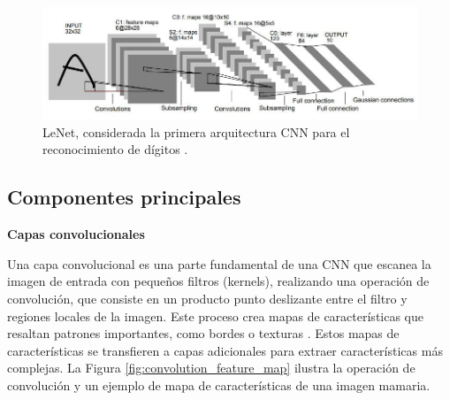 \documentclass[a4paper,10pt]{book}
\begin{document}
\begin{figure}[h!]
    \centering
    \includegraphics[width=0.8\linewidth]{reports//assets/lenet.jpg}
    \caption[LeNet CNN]{LeNet, considerada la primera arquitectura CNN para el reconocimiento de dígitos \cite{lecun_gradient-based_1998}.}
    \label{fig:lenet}
\end{figure}

\subsection{Componentes principales}

\textbf{Capas convolucionales}

Una capa convolucional es una parte fundamental de una CNN que escanea la imagen de entrada con pequeños filtros (kernels), realizando una operación de convolución, que consiste en un producto punto deslizante entre el filtro y regiones locales de la imagen. Este proceso crea mapas de características que resaltan patrones importantes, como bordes o texturas \cite{noauthor_what_2021}. Estos mapas de características se transfieren a capas adicionales para extraer características más complejas. La Figura \ref{fig:convolution_feature_map} ilustra la operación de convolución y un ejemplo de mapa de características de una imagen mamaria.
\end{document}
